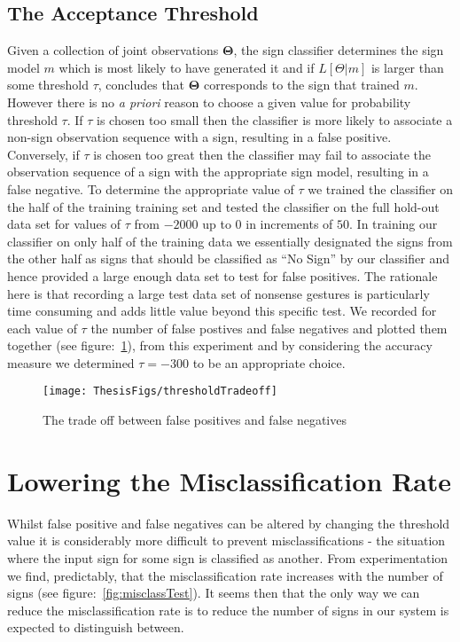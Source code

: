 \subsection{The Acceptance Threshold}
Given a collection of joint observations $\bm{\Theta}$, the sign classifier determines the sign model $m$ which is most likely to have generated it and if $L[\mathcal{\Theta}|m]$ is larger than some threshold $\tau$, concludes that $\bm{\Theta}$ corresponds to the sign that trained $m$. However there is no \emph{a priori} reason to choose a given value for probability threshold $\tau$. If $\tau$ is chosen too small then the classifier is more likely to associate a non-sign observation sequence with a sign, resulting in a false positive. Conversely, if $\tau$ is chosen too great then the classifier may fail to associate the observation sequence of a sign with the appropriate sign model, resulting in a false negative. To determine the appropriate value of $\tau$ we trained the classifier on the half of the training training set and tested the classifier on the full hold-out data set for values of $\tau$ from $-2000$ up to $0$ in increments of $50$. In training our classifier on only half of the training data we essentially designated the signs from the other half as signs that should be classified as ``No Sign'' by our classifier and hence provided a large enough data set to test for false positives. The rationale here is that recording a large test data set of nonsense gestures is particularly time consuming and adds little value beyond this specific test. We recorded for each value of $\tau$ the number of false postives and false negatives and plotted them together (see figure:~\ref{fig:tradeOff}), from this experiment and by considering the accuracy measure we determined $\tau = -300$ to be an appropriate choice. 

\begin{figure}[t]
        \centering
        \texttt{[image: ThesisFigs/thresholdTradeoff]}
        \caption{The trade off between false positives and false negatives}\label{fig:tradeOff}
\end{figure}

\section{Lowering the Misclassification Rate}
Whilst false positive and false negatives can be altered by changing the threshold value it is considerably more difficult to prevent misclassifications - the situation where the input sign for some sign is classified as another. From experimentation we find, predictably, that the misclassification rate increases with the number of signs (see figure:~\ref{fig:misclassTest}). It seems then that the only way we can reduce the misclassification rate is to reduce the number of signs in our system is expected to distinguish between.

